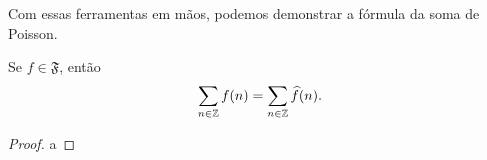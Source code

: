         Com essas ferramentas em mãos, podemos demonstrar a fórmula da soma de Poisson.
        \begin{teorema}
        \label{teo-form-soma-poisson}
            Se $f\in\mathfrak{F}$, então
            \begin{equation*}
                \sum_{n\in\mathbb{Z}} f(n) = \sum_{n\in\mathbb{Z}} \widehat{f}(n).
            \end{equation*}
        \end{teorema}
        \begin{proof}
            a
        \end{proof}
